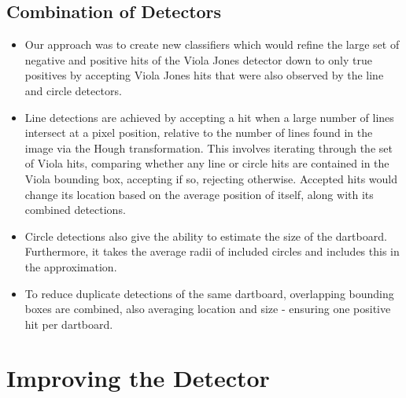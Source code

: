 \documentclass[a4paper]{article}
\begin{document}
\subsection*{Combination of Detectors}
\begin{figure}[H]
  \centering
\end{figure}

\begin{itemize}
    \item Our approach was to create new classifiers which would refine the
      large set of negative and positive hits of the Viola Jones detector down
      to only true positives by accepting Viola Jones hits that were also
      observed by the line and circle detectors.
    \item Line detections are achieved by accepting a hit when a large number
      of lines intersect at a pixel position, relative to the number of lines
      found in the image via the Hough transformation. This involves iterating
      through the set of Viola hits, comparing whether any line or circle hits
      are contained in the Viola bounding box, accepting if so, rejecting
      otherwise. Accepted hits would change its location based on the average position of itself, along with its combined detections.
    \item Circle detections also give the ability to estimate the size of the
      dartboard. Furthermore, it takes the average radii of included circles
      and includes this in the approximation.
    \item To reduce duplicate detections of the same dartboard, overlapping
      bounding boxes are combined, also averaging location and size - ensuring
      one positive hit per dartboard.
\end{itemize}



\section*{Improving the Detector}
\end{document}
